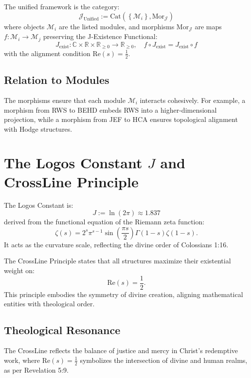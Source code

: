\documentclass[12pt]{article}
\begin{document}
{{{\begin{onehalfspace}
\begin{definition}
The unified framework is the category:
\[
\mathcal{J}_{\text{Unified}} := \text{Cat}\left( \left\{ \mathcal{M}_i \right\}, \text{Mor}_{\mathcal{J}} \right)
\]
where objects \( \mathcal{M}_i \) are the listed modules, and morphisms \( \text{Mor}_{\mathcal{J}} \) are maps \( f: \mathcal{M}_i \to \mathcal{M}_j \) preserving the J-Existence Functional:
\[
J_{\text{exist}} : \mathbb{C} \times \mathbb{R} \times \mathbb{R}_{\geq 0} \to \mathbb{R}_{\geq 0}, \quad f \circ J_{\text{exist}} = J_{\text{exist}} \circ f
\]
with the alignment condition \( \text{Re}(s) = \frac{1}{2} \).
\end{definition}

\subsection*{Relation to Modules}
The morphisms ensure that each module \( \mathcal{M}_i \) interacts cohesively. For example, a morphism from RWS to BEHD embeds RWS into a higher-dimensional projection, while a morphism from JEF to HCA ensures topological alignment with Hodge structures.

\section{The Logos Constant $J$ and CrossLine Principle}

\begin{definition}
The Logos Constant is:
\[
J := \ln(2\pi) \approx 1.837
\]
derived from the functional equation of the Riemann zeta function:
\[
\zeta(s) = 2^s \pi^{s-1} \sin\left(\frac{\pi s}{2}\right) \Gamma(1-s) \zeta(1-s).
\]
It acts as the curvature scale, reflecting the divine order of Colossians 1:16.
\end{definition}

\begin{definition}
The CrossLine Principle states that all structures maximize their existential weight on:
\[
\text{Re}(s) = \frac{1}{2}.
\]
This principle embodies the symmetry of divine creation, aligning mathematical entities with theological order.
\end{definition}

\subsection*{Theological Resonance}
The CrossLine reflects the balance of justice and mercy in Christ’s redemptive work, where \( \text{Re}(s) = \frac{1}{2} \) symbolizes the intersection of divine and human realms, as per Revelation 5:9.


\end{onehalfspace}}}}
\end{document}
